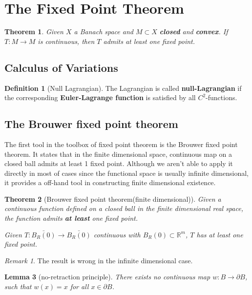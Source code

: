 \documentclass[a4paper,11pt,oneside,fleqn]{book}
\newtheorem{theorem}{Theorem}[section]
\newtheorem{lemma}[theorem]{Lemma}
\theoremstyle{definition}
\newtheorem{definition}{Definition}[section]
\theoremstyle{remark}
\newtheorem*{remark}{Remark}
\begin{document}
\section{The Fixed Point Theorem}
\begin{theorem}
Given $X$ a Banach space and $M \subset X$ \textbf{closed} and \textbf{convex}. If $T : M \rightarrow M$ is continuous, then $T$ admits at least one fixed point. 	
\end{theorem}


\subsection{Calculus of Variations}
\begin{definition}[Null Lagrangian]
	The Lagrangian is called \textbf{null-Lagrangian} if the corresponding \textbf{Euler-Lagrange function} is satisfied by all $C^2$-functions.
\end{definition}


\subsection{The Brouwer fixed point theorem}
The first tool in the toolbox of fixed point theorem is the Brouwer fixed point theorem. It states that in the finite dimensional space, continuous map on a closed ball admits at least 1 fixed point. Although we aren't able to apply it directly in most of cases since the functional space is usually infinite dimensional, it provides a off-hand tool in constructing finite dimensional existence. 

\begin{theorem}[Brouwer fixed point theorem(finite dimensional)]
	Given a continuous function defined on a closed ball in the finite dimensional real space, the function admits \textbf{at least} one fixed point. \par 
	Given $T: \bar{B_R(0)} \rightarrow \bar{B_R(0)}$ continuous with $B_R(0) \subset \mathbb{R}^m$, $T$ has at least one fixed point. 
\end{theorem}
\begin{remark}
The result is wrong in the infinite dimensional case. 	
\end{remark}

\begin{lemma}[no-retraction principle]
	There exists no continuous map $ w: B \rightarrow \partial B$, such that $w(x) = x$ for all $x \in \partial B$. 
\end{lemma}
\end{document}
